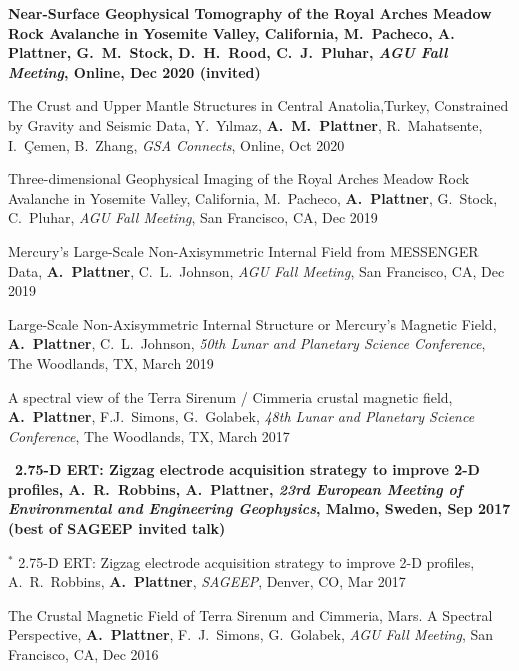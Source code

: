 \documentclass[10pt]{article}
\begin{document}
\spcp
\hspace{-0.4cm} \gr \hspace{-0.03cm} \textbf{Near-Surface Geophysical Tomography of the Royal Arches Meadow Rock Avalanche in Yosemite Valley, California, M.~Pacheco, {\normalfont A. Plattner}, G.~M.~Stock, D.~H.~Rood, C.~J.~Pluhar, \emph{AGU Fall Meeting}, Online, Dec 2020 (invited)}

\spcp
\hspace{-0.4cm} \gr \hspace{-0.03cm} The Crust and Upper Mantle Structures in Central Anatolia,Turkey, Constrained by Gravity and Seismic Data, Y.~Y\i lmaz, \textbf{A.~M.~Plattner}, R.~Mahatsente, I.~\c Cemen, B.~Zhang, \emph{GSA Connects}, Online, Oct 2020

\spcp
\hspace{-0.4cm} \gr \hspace{-0.03cm} Three-dimensional Geophysical Imaging of the Royal Arches Meadow Rock Avalanche in Yosemite Valley, California, M.~Pacheco, \textbf{A.~Plattner}, G.~Stock, C.~Pluhar, \emph{AGU Fall Meeting}, San Francisco, CA, Dec 2019

\spcp
Mercury's Large-Scale Non-Axisymmetric Internal Field from MESSENGER Data, \textbf{A.~Plattner}, C.~L.~Johnson, \emph{AGU Fall Meeting}, San Francisco, CA, Dec 2019

\spcp
Large-Scale Non-Axisymmetric Internal Structure or Mercury's Magnetic Field,
\textbf{A.~Plattner}, C.~L.~Johnson, \emph{50th Lunar and Planetary Science Conference},
The Woodlands, TX, March 2019

\spcp
A spectral view of the Terra Sirenum / Cimmeria crustal magnetic field, \textbf{A.~Plattner}, F.J.~Simons, G.~Golabek, \emph{48th Lunar and Planetary Science Conference}, The Woodlands, TX, March 2017

\spcp 
\hspace{-0.4cm}\ug \, \textbf{2.75-D ERT: Zigzag electrode acquisition strategy
to improve 2-D profiles,
A.~R.~Robbins, {\normalfont A.~Plattner},
\emph{23rd European Meeting of Environmental and Engineering Geophysics}, Malmo, Sweden, Sep 2017 (best of SAGEEP invited talk)}

\spcp 
\hspace{-0.4cm} $^*$ 2.75-D ERT: Zigzag electrode acquisition strategy
to improve 2-D profiles,
A.~R.~Robbins, \textbf{A.~Plattner},
\emph{SAGEEP}, Denver, CO, Mar 2017

\spcp
The Crustal Magnetic Field of Terra Sirenum and Cimmeria, Mars. A Spectral Perspective,
\textbf{A.~Plattner}, F.~J.~Simons, G.~Golabek, 
\emph{AGU Fall Meeting}, San Francisco, CA, Dec 2016
\end{document}

